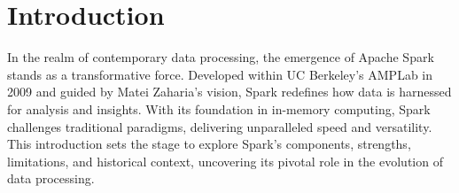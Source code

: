 \section{Introduction}

In the realm of contemporary data processing, the emergence of Apache Spark
stands as a transformative force. Developed within UC Berkeley's AMPLab in 2009
and guided by Matei Zaharia's vision, Spark redefines how data is harnessed for
analysis and insights. With its foundation in in-memory computing, Spark
challenges traditional paradigms, delivering unparalleled speed and versatility.
This introduction sets the stage to explore Spark's components, strengths,
limitations, and historical context, uncovering its pivotal role in the
evolution of data processing.